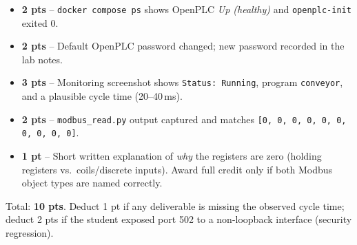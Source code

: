 \documentclass[11pt,a4paper]{article}
\begin{document}
\begin{rubricbox}
\begin{itemize}[leftmargin=*, nosep]
  \item \textbf{2 pts} -- \texttt{docker compose ps} shows OpenPLC \emph{Up (healthy)} and \texttt{openplc-init} exited 0.
  \item \textbf{2 pts} -- Default OpenPLC password changed; new password recorded in the lab notes.
  \item \textbf{3 pts} -- Monitoring screenshot shows \texttt{Status: Running}, program \texttt{conveyor}, and a plausible cycle time (20--40\,ms).
  \item \textbf{2 pts} -- \texttt{modbus\_read.py} output captured and matches \texttt{[0, 0, 0, 0, 0, 0, 0, 0, 0, 0]}.
  \item \textbf{1 pt} -- Short written explanation of \emph{why} the registers are zero (holding registers vs.\ coils/discrete inputs). Award full credit only if both Modbus object types are named correctly.
\end{itemize}
Total: \textbf{10 pts}. Deduct 1 pt if any deliverable is missing the observed cycle time; deduct 2 pts if the student exposed port 502 to a non-loopback interface (security regression).
\end{rubricbox}
\end{document}
